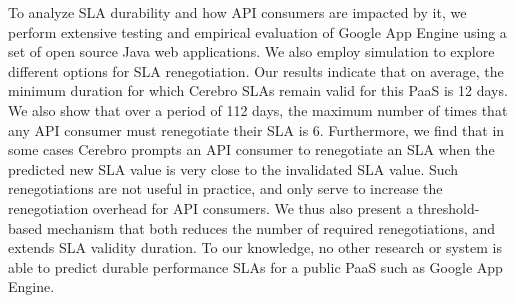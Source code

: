 
To analyze SLA durability and how API consumers are 
impacted by it, we perform extensive testing and empirical evaluation
of Google App Engine using a set of open source Java web applications.  
We also employ simulation to explore different options for SLA renegotiation.
Our results indicate that on average, the minimum duration for which Cerebro SLAs 
remain valid for this PaaS is 12 days. We also show that
over a period of 112 days, the maximum number of times that any API consumer must renegotiate
their SLA is 6.  Furthermore, we find that in some cases Cerebro prompts an API consumer to
renegotiate an SLA when the predicted new SLA value is very close to the invalidated SLA value. 
Such renegotiations are not useful in practice, and only serve to increase the renegotiation overhead
for API consumers. We thus also present a threshold-based mechanism that both reduces 
the number of required renegotiations, and extends SLA validity duration.
To our knowledge, no other research or system is able to predict
durable performance SLAs for a public PaaS such as Google App Engine.